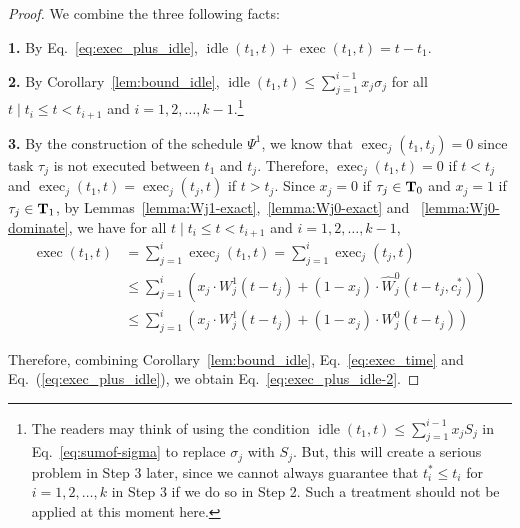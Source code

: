 \begin{proof}
We combine the three following facts:

\noindent\textbf{1.} By Eq.~\eqref{eq:exec_plus_idle}, $\operatorname{idle}(t_1, t)+\operatorname{exec}(t_1, t) = t-t_1$.

\noindent\textbf{2.} By Corollary~\ref{lem:bound_idle}, $\operatorname{idle}(t_1, t) \leq \sum_{j=1}^{i-1}
x_j \sigma_j $ for all $t \mid t_{i} \leq t < t_{i+1}$ and $i=1,2,\ldots,k-1$.\footnote{\label{footnote-why-sigma}The readers
  may think of using the condition $\operatorname{idle}(t_1, t) \leq
  \sum_{j=1}^{i-1} x_j S_j$ in Eq.~\eqref{eq:sumof-sigma} to
  replace $\sigma_j$ with $S_j$. But, this will create a serious
  problem in Step 3 later, since we cannot always guarantee that
  $t_i^*\leq t_i$ for $i=1,2,\ldots,k$ in Step 3 if we do so in Step 2. Such a treatment should not be applied at this moment here.}

\noindent\textbf{3.} By the construction of the
schedule $\Psi^1$, we know that $\operatorname{exec}_j(t_1, t_j)=0$ since task $\tau_j$ is not executed between $t_1$ and $t_j$. Therefore, $\operatorname{exec}_j(t_1, t)=0$ if $t<t_j$ and $\operatorname{exec}_j(t_1, t)=\operatorname{exec}_j(t_j, t)$ if $t > t_j$. Since $x_j = 0$ if $\tau_j \in {\bf T}_0$ and $x_j = 1$ if $\tau_j \in {\bf T}_1$, by Lemmas~\ref{lemma:Wj1-exact},~\ref{lemma:Wj0-exact} and ~\ref{lemma:Wj0-dominate}, we have 
for all $t \mid t_{i} \leq t < t_{i+1}$ and $i=1,2,\ldots,k-1$,
{\footnotesize \begin{align}
\label{eq:exec_time}
\operatorname{exec}(t_1, t) & = \sum_{j=1}^{i} \operatorname{exec}_j(t_1, t) = \sum_{j=1}^{i} \operatorname{exec}_j(t_j, t) \nonumber \\
& \leq \sum_{j=1}^{i} \left( x_j\cdot W_j^1(t-t_j)  + (1-x_j)\cdot \widehat{W}_j^0(t-t_j, c_j^*) \right) \nonumber \\
&\leq \sum_{j=1}^{i} \left( x_j\cdot W_j^1(t-t_j)  + (1-x_j)\cdot W_j^0(t-t_j) \right)
\end{align}} 

Therefore, combining Corollary~\ref{lem:bound_idle}, Eq.~\eqref{eq:exec_time} and Eq.~(\ref{eq:exec_plus_idle}), we obtain Eq.~\eqref{eq:exec_plus_idle-2}. 


\end{proof}
